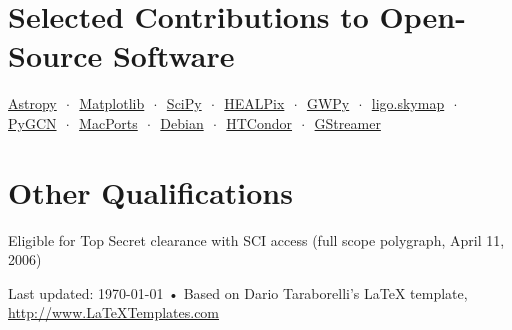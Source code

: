 \documentclass[10pt, letterpaper]{article} %
\newcommand{\listsep}{$\,\cdot\,$}
\begin{document}

\section*{Selected Contributions to Open-Source Software}

\href{http://www.astropy.org}{Astropy} \listsep{} \href{http://matplotlib.org}{Matplotlib} \listsep{} \href{http://www.scipy.org}{SciPy} \listsep{} \href{http://healpix.jpl.nasa.gov}{HEALPix} \listsep{} \href{https://gwpy.github.io}{GWPy} \listsep{} \href{https://lscsoft.docs.ligo.org/ligo.skymap/}{ligo.skymap} \listsep{} \href{https://github.com/lpsinger/pygcn}{PyGCN} \listsep{} \href{http://www.macports.org/}{MacPorts} \listsep{} \href{https://www.debian.org}{Debian} \listsep{} \href{http://research.cs.wisc.edu/htcondor/}{HTCondor} \listsep{} \href{http://gstreamer.net}{GStreamer}

\section*{Other Qualifications}

Eligible for Top Secret clearance with SCI access (full scope polygraph, April 11, 2006)

%

\vfill{} %


\begin{center}
{\scriptsize Last updated: \today\- •\- Based on Dario Taraborelli's LaTeX template, \href{http://www.LaTeXTemplates.com}{http://www.LaTeXTemplates.com}} %
\end{center}

\end{document}
